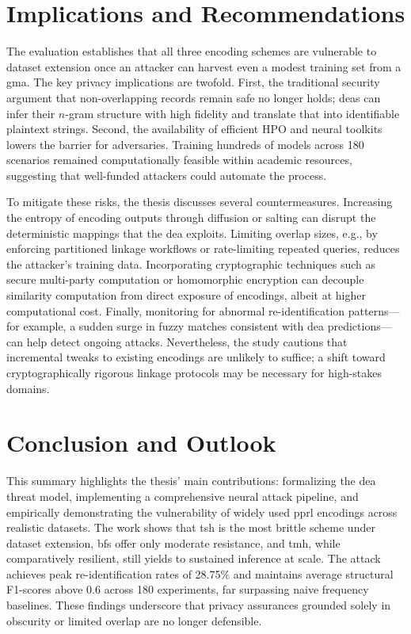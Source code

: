 \documentclass[a4paper,11pt]{scrartcl}
\begin{document}
\section{Implications and Recommendations}
The evaluation establishes that all three encoding schemes are vulnerable to dataset extension once an attacker can harvest even a modest training set from a \ac{gma}. The key privacy implications are twofold. First, the traditional security argument that non-overlapping records remain safe no longer holds; \ac{dea}s can infer their $n$-gram structure with high fidelity and translate that into identifiable plaintext strings. Second, the availability of efficient HPO and neural toolkits lowers the barrier for adversaries. Training hundreds of models across 180 scenarios remained computationally feasible within academic resources, suggesting that well-funded attackers could automate the process.

To mitigate these risks, the thesis discusses several countermeasures. Increasing the entropy of encoding outputs through diffusion or salting can disrupt the deterministic mappings that the \ac{dea} exploits. Limiting overlap sizes, e.g., by enforcing partitioned linkage workflows or rate-limiting repeated queries, reduces the attacker's training data. Incorporating cryptographic techniques such as secure multi-party computation or homomorphic encryption can decouple similarity computation from direct exposure of encodings, albeit at higher computational cost. Finally, monitoring for abnormal re-identification patterns---for example, a sudden surge in fuzzy matches consistent with \ac{dea} predictions---can help detect ongoing attacks. Nevertheless, the study cautions that incremental tweaks to existing encodings are unlikely to suffice; a shift toward cryptographically rigorous linkage protocols may be necessary for high-stakes domains.

\section{Conclusion and Outlook}
This summary highlights the thesis' main contributions: formalizing the \ac{dea} threat model, implementing a comprehensive neural attack pipeline, and empirically demonstrating the vulnerability of widely used \ac{pprl} encodings across realistic datasets. The work shows that \ac{tsh} is the most brittle scheme under dataset extension, \ac{bf}s offer only moderate resistance, and \ac{tmh}, while comparatively resilient, still yields to sustained inference at scale. The attack achieves peak re-identification rates of 28.75\% and maintains average structural F1-scores above 0.6 across 180 experiments, far surpassing naive frequency baselines. These findings underscore that privacy assurances grounded solely in obscurity or limited overlap are no longer defensible.
\end{document}
